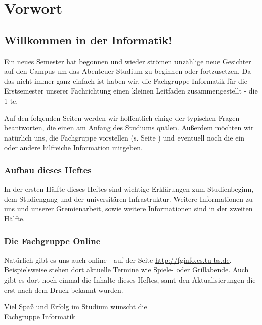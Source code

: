 
\section{Vorwort}
\label{vorwort}
	\begin{multicols}{2}
	\subsection*{Willkommen in der Informatik!}	

	Ein neues Semester hat begonnen und wieder strömen unzählige neue Gesichter auf den Campus um das Abenteuer Studium zu beginnen oder fortzusetzen. Da das nicht immer ganz einfach ist haben wir, die Fachgruppe Informatik für die Erstsemester unserer Fachrichtung einen kleinen Leitfaden zusammengestellt - die 1-te.

	Auf den folgenden Seiten werden wir hoffentlich einige der typischen Fragen beantworten, die einen am Anfang des Studiums quälen. Außerdem möchten wir natürlich uns, die Fachgruppe vorstellen (s. Seite \pageref{fachgruppe}) und eventuell noch die ein oder andere hilfreiche Information mitgeben. 

	\subsubsection*{Aufbau dieses Heftes}
		In der ersten Hälfte dieses Heftes sind wichtige
		Erklärungen zum Studienbeginn, dem Studiengang und der
		universitären Infrastruktur. Weitere Informationen zu
		uns und unserer Gremienarbeit, sowie weitere
		Informationen sind in der zweiten Hälfte.
\columnbreak
	\subsubsection*{Die Fachgruppe Online}
		Natürlich gibt es uns auch online - auf der Seite \url{http://fginfo.cs.tu-bs.de}. Beispielsweise stehen dort aktuelle Termine wie Spiele- oder Grillabende. Auch gibt es dort noch einmal die Inhalte dieses Heftes, samt den Aktualisierungen die erst nach dem Druck bekannt wurden. 

	\vspace*{0.5cm}

	Viel Spaß und Erfolg im  Studium wünscht  die\\
	\hspace*{2cm}Fachgruppe Informatik
	\end{multicols}
